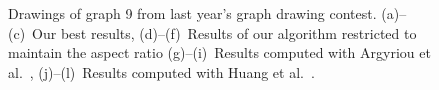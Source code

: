 \documentclass[runningheads]{llncs}
\begin{document}
{\begin{figure}[htbp]
{}
\hfill
{}
\caption{Drawings of graph 9 from last year's graph drawing contest. 
(a)--(c)~Our best results,
(d)--(f)~Results of our algorithm restricted to maintain the aspect ratio 
(g)--(i)~Results computed with Argyriou et al.~\cite{DBLP:journals/cj/ArgyriouBS13}, 
(j)--(l)~Results computed with Huang et al.~\cite{DBLP:journals/vlc/HuangEHL13}.}
\label{fig:graph9}
\end{figure}}{}
\end{document}
